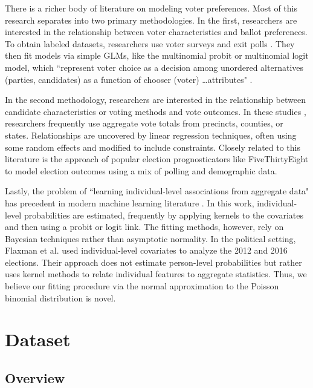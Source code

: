 \documentclass[10pt, letterpaper]{article}
\begin{document}
\begin{multicols}{2}
There is a richer body of literature on modeling voter preferences. Most of this research separates into two primary methodologies. In the first, researchers are interested in the relationship between voter characteristics and ballot preferences. To obtain labeled datasets, researchers use voter surveys \cite{dubrow2007choosing} and exit polls \cite{carsey1995contextual}. They then fit models via simple GLMs, like the multinomial probit or multinomial logit model, which ``represent voter choice as a decision among unordered alternatives (parties, candidates) as a function of chooser (voter) \dots attributes" \cite{DOW2004107}. 

In the second methodology, researchers are interested in the relationship between candidate characteristics or voting methods and vote outcomes. In these studies \cite{miller1998impact, frisina2008ballot, 10.2307/24371899}, researchers frequently use aggregate vote totals from precincts, counties, or states. Relationships are uncovered by linear regression techniques, often using some random effects \cite{10.2307/2585758} and modified to include constraints. Closely related to this literature is the approach of popular election prognosticators like FiveThirtyEight \cite{538} to model election outcomes using a mix of polling and demographic data. 

Lastly, the problem of ``learning individual-level associations from aggregate data" \cite{flaxman2015supported} has precedent in modern machine learning literature \cite{patrini2014almost, kuck2012learning, sun2015message, quadrianto2009estimating}. In this work, individual-level probabilities are estimated, frequently by applying kernels to the covariates and then using a probit or logit link. The fitting methods, however, rely on Bayesian techniques rather than asymptotic normality. In the political setting, Flaxman et al. used individual-level covariates to analyze the 2012 \cite{flaxman2015supported} and 2016 \cite{flaxman2016understanding}  elections. Their approach does not estimate person-level probabilities but rather uses kernel methods to relate individual features to aggregate statistics. Thus, we believe our fitting procedure via the normal approximation to the Poisson binomial distribution is novel.

\section{Dataset}

\subsection{Overview}


\end{multicols}
\end{document}
